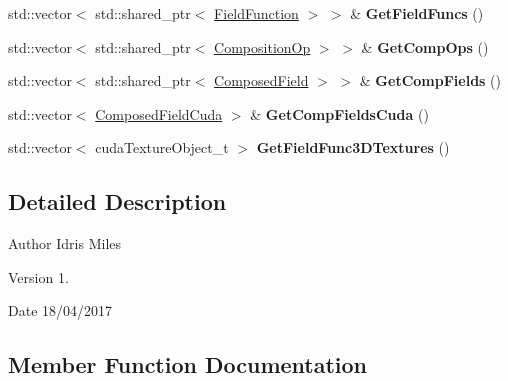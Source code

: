 \begin{DoxyCompactItemize}
\item 
std\+::vector$<$ std\+::shared\+\_\+ptr$<$ \hyperlink{classFieldFunction}{Field\+Function} $>$ $>$ \& {\bfseries Get\+Field\+Funcs} ()\hypertarget{classGlobalFieldFunction_ad8bbd29e40c1c71e5756813df01842b5}{}\label{classGlobalFieldFunction_ad8bbd29e40c1c71e5756813df01842b5}

\item 
std\+::vector$<$ std\+::shared\+\_\+ptr$<$ \hyperlink{classCompositionOp}{Composition\+Op} $>$ $>$ \& {\bfseries Get\+Comp\+Ops} ()\hypertarget{classGlobalFieldFunction_a4ebe578648d6b852f90c2aab151bfa0a}{}\label{classGlobalFieldFunction_a4ebe578648d6b852f90c2aab151bfa0a}

\item 
std\+::vector$<$ std\+::shared\+\_\+ptr$<$ \hyperlink{classComposedField}{Composed\+Field} $>$ $>$ \& {\bfseries Get\+Comp\+Fields} ()\hypertarget{classGlobalFieldFunction_a8e2de1aaa09f16e7aa8337e74a456454}{}\label{classGlobalFieldFunction_a8e2de1aaa09f16e7aa8337e74a456454}

\item 
std\+::vector$<$ \hyperlink{classComposedFieldCuda}{Composed\+Field\+Cuda} $>$ \& {\bfseries Get\+Comp\+Fields\+Cuda} ()\hypertarget{classGlobalFieldFunction_a2b5afb30913aede665c40442ba25d8b3}{}\label{classGlobalFieldFunction_a2b5afb30913aede665c40442ba25d8b3}

\item 
std\+::vector$<$ cuda\+Texture\+Object\+\_\+t $>$ {\bfseries Get\+Field\+Func3\+D\+Textures} ()\hypertarget{classGlobalFieldFunction_a312f448c044ddc61bab523d3b1b20e8a}{}\label{classGlobalFieldFunction_a312f448c044ddc61bab523d3b1b20e8a}

\end{DoxyCompactItemize}


\subsection{Detailed Description}
\begin{DoxyAuthor}{Author}
Idris Miles 
\end{DoxyAuthor}
\begin{DoxyVersion}{Version}
1. 
\end{DoxyVersion}
\begin{DoxyDate}{Date}
18/04/2017 
\end{DoxyDate}


\subsection{Member Function Documentation}
